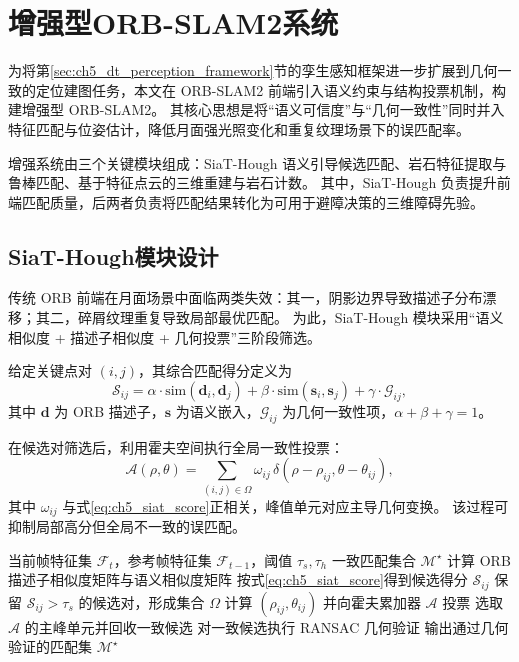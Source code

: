\section{增强型ORB-SLAM2系统}
\label{sec:ch5_orbslam}

为将第\ref{sec:ch5_dt_perception_framework}节的孪生感知框架进一步扩展到几何一致的定位建图任务，本文在 ORB-SLAM2 前端引入语义约束与结构投票机制，构建增强型 ORB-SLAM2。
其核心思想是将“语义可信度”与“几何一致性”同时并入特征匹配与位姿估计，降低月面强光照变化和重复纹理场景下的误匹配率。

增强系统由三个关键模块组成：SiaT-Hough 语义引导候选匹配、岩石特征提取与鲁棒匹配、基于特征点云的三维重建与岩石计数。
其中，SiaT-Hough 负责提升前端匹配质量，后两者负责将匹配结果转化为可用于避障决策的三维障碍先验。

\subsection{SiaT-Hough模块设计}
\label{subsec:ch5_siat_hough}

传统 ORB 前端在月面场景中面临两类失效：其一，阴影边界导致描述子分布漂移；其二，碎屑纹理重复导致局部最优匹配。
为此，SiaT-Hough 模块采用“语义相似度 + 描述子相似度 + 几何投票”三阶段筛选。

给定关键点对 $(i,j)$，其综合匹配得分定义为
\begin{equation}
\mathcal{S}_{ij}=\alpha \cdot \mathrm{sim}\!\left(\mathbf{d}_i,\mathbf{d}_j\right)
+\beta \cdot \mathrm{sim}\!\left(\mathbf{s}_i,\mathbf{s}_j\right)
+\gamma \cdot \mathcal{G}_{ij},
\label{eq:ch5_siat_score}
\end{equation}
其中 $\mathbf{d}$ 为 ORB 描述子，$\mathbf{s}$ 为语义嵌入，$\mathcal{G}_{ij}$ 为几何一致性项，$\alpha+\beta+\gamma=1$。

在候选对筛选后，利用霍夫空间执行全局一致性投票：
\begin{equation}
\mathcal{A}(\rho,\theta)=\sum_{(i,j)\in\Omega} \omega_{ij}\,
\delta\!\left(\rho-\rho_{ij},\theta-\theta_{ij}\right),
\label{eq:ch5_hough_vote}
\end{equation}
其中 $\omega_{ij}$ 与式\eqref{eq:ch5_siat_score}正相关，峰值单元对应主导几何变换。
该过程可抑制局部高分但全局不一致的误匹配。

\begin{algorithm}[H]
\caption{SiaT-Hough 语义引导匹配}
\label{alg:ch5_siat_hough}
\begin{algorithmic}[1]
\REQUIRE 当前帧特征集 $\mathcal{F}_t$，参考帧特征集 $\mathcal{F}_{t-1}$，阈值 $\tau_s,\tau_h$
\ENSURE 一致匹配集合 $\mathcal{M}^\star$
\STATE 计算 ORB 描述子相似度矩阵与语义相似度矩阵
\STATE 按式\eqref{eq:ch5_siat_score}得到候选得分 $\mathcal{S}_{ij}$
\STATE 保留 $\mathcal{S}_{ij}>\tau_s$ 的候选对，形成集合 $\Omega$
\STATE 计算 $(\rho_{ij},\theta_{ij})$ 并向霍夫累加器 $\mathcal{A}$ 投票
\ENDFOR
\STATE 选取 $\mathcal{A}$ 的主峰单元并回收一致候选
\STATE 对一致候选执行 RANSAC 几何验证
\STATE 输出通过几何验证的匹配集 $\mathcal{M}^\star$
\end{algorithmic}
\end{algorithm}

